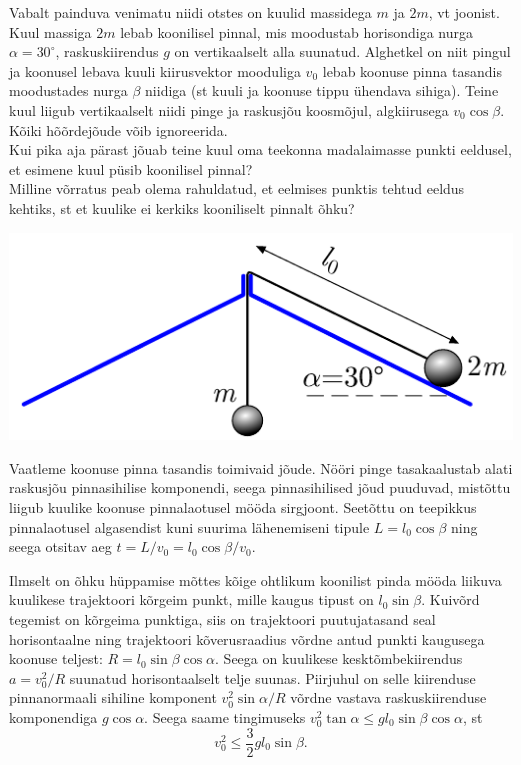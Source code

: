 
Vabalt painduva venimatu niidi otstes on kuulid massidega $m$ ja $2m$, vt joonist. Kuul massiga $2m$ lebab koonilisel pinnal, mis moodustab horisondiga nurga $\alpha=30^\circ$, raskuskiirendus $g$ on vertikaalselt alla suunatud. Alghetkel on niit pingul ja koonusel lebava kuuli kiirusvektor mooduliga $v_0$ lebab koonuse pinna tasandis moodustades nurga $\beta$ niidiga (st kuuli ja koonuse tippu ühendava sihiga). Teine kuul liigub vertikaalselt niidi pinge ja raskusjõu koosmõjul, algkiirusega $v_0\cos\beta$. Kõiki hõõrdejõude võib ignoreerida.\\
	\osa Kui pika aja pärast  jõuab teine kuul oma teekonna madalaimasse punkti eeldusel, et esimene kuul püsib koonilisel pinnal?\\
	\osa Milline võrratus peab olema rahuldatud, et eelmises punktis tehtud eeldus kehtiks, st et kuulike ei kerkiks kooniliselt pinnalt õhku?
	
	\begin{center}
		\vspace{-13pt}
		\includegraphics[width=0.55\linewidth]{2020-lahg-10-yl.pdf}
	\end{center}


\hint

\solu
\osa Vaatleme koonuse pinna tasandis toimivaid jõude. Nööri pinge tasakaalustab alati raskusjõu pinnasihilise komponendi, seega pinnasihilised jõud puuduvad, mistõttu liigub kuulike koonuse pinnalaotusel mööda sirgjoont. Seetõttu on teepikkus pinnalaotusel algasendist kuni suurima lähenemiseni tipule $L=l_0\cos\beta$ ning seega otsitav aeg $t=L/v_0=l_0\cos\beta/v_0$. 

\osa Ilmselt on õhku hüppamise mõttes kõige ohtlikum koonilist pinda mööda liikuva kuulikese trajektoori kõrgeim punkt, mille kaugus tipust on $l_0\sin\beta$. Kuivõrd tegemist on kõrgeima punktiga, siis on trajektoori puutujatasand seal horisontaalne ning trajektoori kõverusraadius võrdne antud punkti kaugusega koonuse teljest: $R=l_0\sin\beta\cos\alpha$. Seega on kuulikese kesktõmbekiirendus $a=v_0^2/R$ suunatud horisontaalselt telje suunas. Piirjuhul on selle kiirenduse pinnanormaali sihiline komponent $v_0^2\sin\alpha/R$ võrdne vastava raskuskiirenduse komponendiga $g\cos\alpha$. Seega saame tingimuseks $v_0^2\tan\alpha\le gl_0\sin\beta\cos\alpha$, st $$v_0^2\le \frac{3}{2}gl_0\sin\beta.$$
\probend